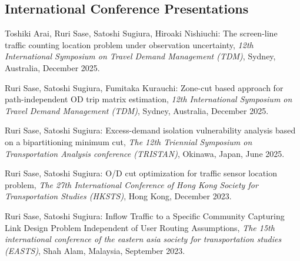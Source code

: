 \documentclass[letterpaper,11pt]{article}
\begin{document}
\subsection*{International Conference Presentations}
\begin{enumerate}[leftmargin=0.3in, label=\arabic*.]
    \small{
    \item Toshiki Arai, Ruri Sase, Satoshi Sugiura, Hiroaki Nishiuchi: The screen-line traffic counting location problem under observation uncertainty, \textit{12th International Symposium on Travel Demand Management (TDM)}, Sydney, Australia, December 2025.
    \item Ruri Sase, Satoshi Sugiura, Fumitaka Kurauchi: Zone-cut based approach for path-independent OD trip matrix estimation, \textit{12th International Symposium on Travel Demand Management (TDM)}, Sydney, Australia, December 2025.
    \item Ruri Sase, Satoshi Sugiura: Excess-demand isolation vulnerability analysis based on a bipartitioning minimum cut, \textit{The 12th Triennial Symposium on Transportation Analysis conference (TRISTAN)}, Okinawa, Japan, June 2025.
    \item Ruri Sase, Satoshi Sugiura: O/D cut optimization for traffic sensor location problem, \textit{The 27th International Conference of Hong Kong Society for Transportation Studies (HKSTS)}, Hong Kong, December 2023.
    \item Ruri Sase, Satoshi Sugiura: Inflow Traffic to a Specific Community Capturing Link Design Problem Independent of User Routing Assumptions, \textit{The 15th international conference of the eastern asia society for transportation studies (EASTS)}, Shah Alam, Malaysia, September 2023.
    }
\end{enumerate}
\end{document}

